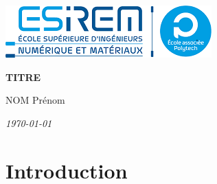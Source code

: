 \documentclass[a4paper, 12pt]{article}
\def\logouniversite{img/UBFC.png}
\newcommand{\titre}{\color{blue}TITRE}
\newcommand{\auteur}{NOM Prénom}
\newcommand{\datePublication}{\today}
\begin{document}
\hypersetup{pdfborder=0 0 0}

\begin{titlepage}
\reversemarginpar{}


{\centering
    \vspace{3cm}
    \hspace{1cm} \includegraphics[width=.5\textwidth]{img/logo.png}
    \par\vspace{5cm}
    {\scshape\huge\textbf{\hspace{2cm}\titre}} \par\vspace{6cm}
    

    \begin{flushright}
            \item \auteur 
            \item \textit{\datePublication}
    \end{flushright}

}

\end{titlepage}

\begingroup
\tableofcontents
\listoffigures
\endgroup



\section{Introduction}
\end{document}
